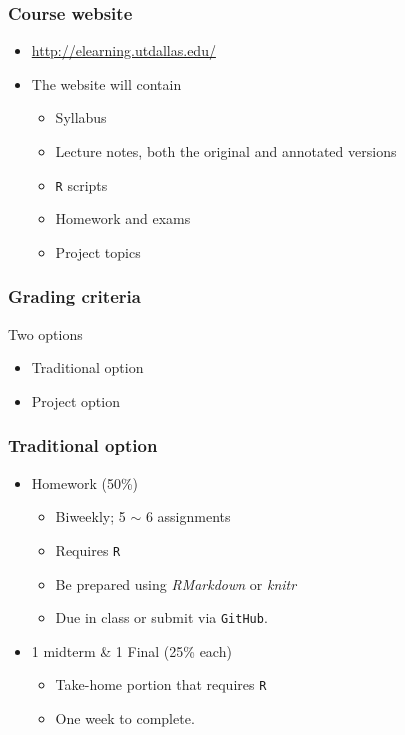 \documentclass{beamer}
\begin{document}
\begin{frame}
\frametitle{Course website}
\begin{itemize}
\item \url{http://elearning.utdallas.edu/}
\item The website will contain 
\begin{itemize}
\item Syllabus
\item Lecture notes, both the original and annotated versions
\item \texttt{R} scripts
\item Homework and exams
\item Project topics
\end{itemize}
\end{itemize}
\end{frame}

\begin{frame}
\frametitle{Grading criteria}
Two options
\begin{itemize}
\item Traditional option
\item Project option
\end{itemize}
\end{frame}

\begin{frame}
\frametitle{Traditional option}
\begin{itemize}
\item Homework (50\%)
\begin{itemize}
\item Biweekly; 5 $\sim$ 6 assignments
\item Requires \texttt{R}
\item Be prepared using \textit{RMarkdown} or \textit{knitr}
\item Due in class or submit via \texttt{GitHub}.
\end{itemize}
\item 1 midterm \& 1 Final (25\% each)
\begin{itemize}
\item Take-home portion that requires \texttt{R}
\item One week to complete.
\end{itemize}
\end{itemize}
\end{frame}
\end{document}
